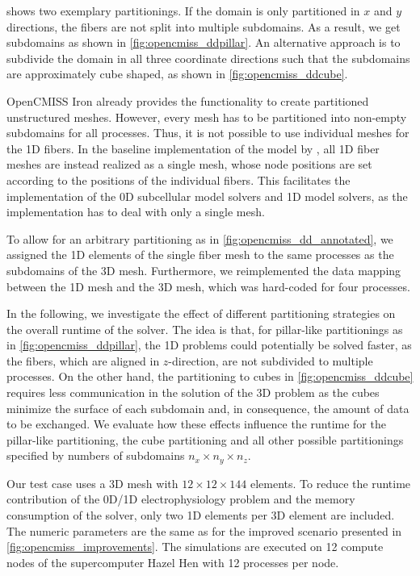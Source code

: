  shows two exemplary partitionings. If the domain is only partitioned in $x$ and $y$ directions, the fibers are not split into multiple subdomains. As a result, we get  subdomains as shown in \cref{fig:opencmiss_ddpillar}. An alternative approach is to subdivide the domain in all three coordinate directions such that the subdomains are approximately cube shaped, as shown in \cref{fig:opencmiss_ddcube}.

OpenCMISS Iron already provides the functionality to create partitioned unstructured meshes. However, every mesh has to be partitioned into non-empty subdomains for all processes. Thus, it is not possible to use individual meshes for the 1D fibers.
In the baseline implementation of the model by \cite{Heidlauf2013}, all 1D fiber meshes are instead realized as a single mesh, whose node positions are set according to the positions of the individual fibers. This facilitates the implementation of the 0D subcellular model solvers and 1D model solvers, as the implementation has to deal with only a single mesh. 

To allow for an arbitrary partitioning as in \cref{fig:opencmiss_dd_annotated}, we assigned the 1D elements of the single fiber mesh to the same processes as the subdomains of the 3D mesh. Furthermore, we reimplemented the data mapping between the 1D mesh and the 3D mesh, which was hard-coded for four processes.

In the following, we investigate the effect of different partitioning strategies on the overall runtime of the solver. The idea is that, for pillar-like partitionings as in \cref{fig:opencmiss_ddpillar}, the 1D problems could potentially be solved faster, as the fibers, which are aligned in $z$-direction, are not subdivided to multiple processes. On the other hand, the partitioning to cubes in \cref{fig:opencmiss_ddcube} requires less communication in the solution of the 3D problem as the cubes minimize the surface of each subdomain and, in consequence, the amount of data to be exchanged. We evaluate how these effects influence the runtime for the pillar-like partitioning, the cube partitioning and all other possible partitionings specified by numbers of subdomains $n_x \times n_y \times n_z$.

Our test case uses a 3D mesh with $12 \times 12 \times 144$ elements. To reduce the runtime contribution of the 0D/1D electrophysiology problem and the memory consumption of the solver, only two 1D elements per 3D element are included. The numeric parameters are the same as for the improved scenario presented in \cref{fig:opencmiss_improvements}. The simulations are executed on 12 compute nodes of the supercomputer Hazel Hen with 12 processes per node.

